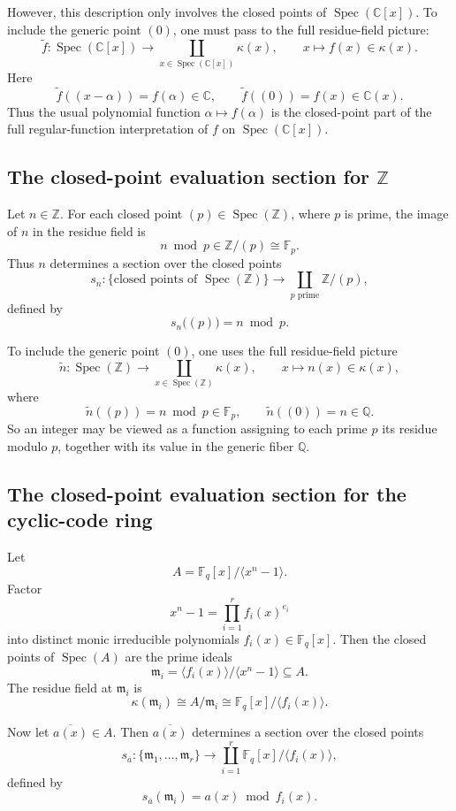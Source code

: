 \documentclass[11pt]{article}
\theoremstyle{definition}
\newcommand{\Z}{\mathbb{Z}}
\newcommand{\Q}{\mathbb{Q}}
\newcommand{\C}{\mathbb{C}}
\newcommand{\F}{\mathbb{F}}
\newcommand{\Spec}{\operatorname{Spec}}
\newcommand{\kk}[1]{\kappa\!\left(#1\right)}
\newcommand{\ideal}[1]{\langle #1\rangle}
\newcommand{\ol}[1]{\overline{#1}}
\begin{document}
However, this description only involves the closed points of \(\Spec(\C[x])\).  
To include the generic point \((0)\), one must pass to the full residue-field picture:
\[
\widetilde f:\Spec(\C[x])\longrightarrow \coprod_{x\in \Spec(\C[x])}\kappa(x),
\qquad
x\longmapsto f(x)\in \kappa(x).
\]
Here
\[
\widetilde f((x-\alpha))=f(\alpha)\in \C,
\qquad
\widetilde f((0))=f(x)\in \C(x).
\]
Thus the usual polynomial function \(\alpha\mapsto f(\alpha)\) is the closed-point part of the full regular-function interpretation of \(f\) on \(\Spec(\C[x])\).

\subsection{The closed-point evaluation section for \texorpdfstring{$\Z$}{Z}}

Let \(n\in \Z\). For each closed point \((p)\in \Spec(\Z)\), where \(p\) is prime, the image of \(n\) in the residue field is
\[
n \bmod p \in \Z/(p)\cong \F_p.
\]
Thus \(n\) determines a section over the closed points
\[
s_n:\{\text{closed points of }\Spec(\Z)\}\longrightarrow
\coprod_{p\text{ prime}} \Z/(p),
\]
defined by
\[
s_n\bigl((p)\bigr)=n \bmod p.
\]

To include the generic point \((0)\), one uses the full residue-field picture
\[
\widetilde n:\Spec(\Z)\longrightarrow \coprod_{x\in \Spec(\Z)}\kappa(x),
\qquad
x\longmapsto n(x)\in \kappa(x),
\]
where
\[
\widetilde n((p))=n\bmod p\in \F_p,
\qquad
\widetilde n((0))=n\in \Q.
\]
So an integer may be viewed as a function assigning to each prime \(p\) its residue modulo \(p\), together with its value in the generic fiber \(\Q\).

\newpage
\subsection{The closed-point evaluation section for the cyclic-code ring}

Let
\[
A=\F_q[x]/\ideal{x^n-1}.
\]
Factor
\[
x^n-1=\prod_{i=1}^r f_i(x)^{e_i}
\]
into distinct monic irreducible polynomials \(f_i(x)\in \F_q[x]\). Then the closed points of \(\Spec(A)\) are the prime ideals
\[
\mathfrak m_i=\ideal{f_i(x)}/\ideal{x^n-1}\subseteq A.
\]
The residue field at \(\mathfrak m_i\) is
\[
\kk{\mathfrak m_i}
\cong
A/\mathfrak m_i
\cong
\F_q[x]/\ideal{f_i(x)}.
\]

Now let \(\ol{a(x)}\in A\). Then \(\ol{a(x)}\) determines a section over the closed points
\[
s_{\ol{a}}:\{\mathfrak m_1,\dots,\mathfrak m_r\}
\longrightarrow
\coprod_{i=1}^r \F_q[x]/\ideal{f_i(x)},
\]
defined by
\[
s_{\ol{a}}(\mathfrak m_i)=a(x)\bmod f_i(x).
\]
\end{document}
